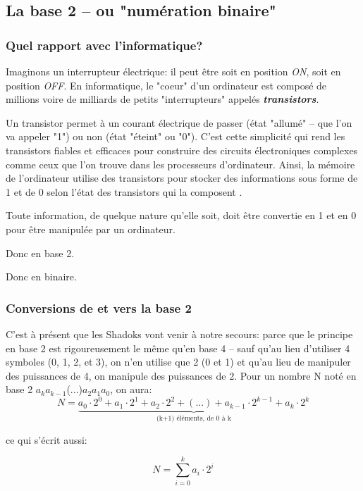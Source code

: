 \documentclass[12pt]{article}
\begin{document}
	\subsection{La base 2 -- ou "numération binaire"}
	
	\subsubsection*{Quel rapport avec l'informatique?}
	
	Imaginons un interrupteur électrique: il peut être soit en position \textit{ON}, soit en position \textit{OFF}. En informatique, le "coeur" d'un ordinateur est composé de millions voire de milliards de petits "interrupteurs" appelés \textbf{\textit{transistors}}.
	
	Un transistor permet à un courant électrique de passer (état "allumé" -- que l'on va appeler "1") ou non (état "éteint" ou "0"). C’est cette simplicité qui rend les transistors fiables et efficaces pour construire des circuits électroniques complexes comme ceux que l'on trouve dans les processeurs d’ordinateur. Ainsi, la mémoire de l’ordinateur utilise des transistors pour stocker des informations sous forme de 1 et de 0 selon l'état des transistors qui la composent .
	
	Toute information, de quelque nature qu'elle soit, doit être convertie en 1 et en 0 pour être manipulée par un ordinateur.
	
	Donc en base 2.
	
	Donc en binaire.
	
	\subsubsection*{Conversions de et vers la base 2}
	
	C'est à présent que les Shadoks vont venir à notre secours: parce que le principe en base 2 est rigoureusement le même qu'en base 4 -- sauf qu'au lieu d'utiliser 4 symboles (0, 1, 2, et 3), on n'en utilise que 2 (0 et 1) et qu'au lieu de manipuler des puissances de 4, on manipule des puissances de 2. Pour un nombre N noté en base 2 \( a_k \)\( a_{k-1} \)(...)\( a_2 \)\( a_1 \)\( a_0 \), on aura:
	\[ N = \underbrace{a_0 \cdot 2^0 + a_1 \cdot 2^1 + a_2 \cdot 2^2 + (...) + a_{k-1} \cdot 2^{k-1} + a_k \cdot 2^k}_{\text{(k+1)\ éléments, de 0 à k}}\]
	
	ce qui s'écrit aussi:
	
	\[ N = \sum_{i=0}^{k} a_i \cdot 2^i \]
	
\end{document}
